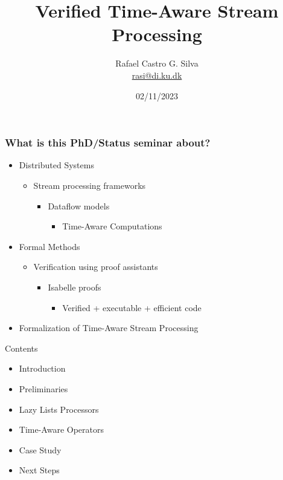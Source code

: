 \documentclass[aspectratio=169,10pt]{beamer}
\title[Verified Time-Aware Stream Processing]{Verified Time-Aware Stream Processing}
\author[Rafael Castro]{
  Rafael Castro G. Silva\\\medskip
  {\small \url{rasi@di.ku.dk}}}
\date{02/11/2023}
\institute[UCPH]{
  Department of Computer Science \\
  University of Copenhagen}
\begin{document}
\begin{frame}
  \titlepage

\end{frame}

\begin{frame}[fragile]
  \frametitle{What is this PhD/Status seminar about?}
  \begin{itemize}
          \pause
    \item Distributed Systems
          \begin{itemize}
            \item Stream processing frameworks
                  \begin{itemize}
                    \item Dataflow models
                          \begin{itemize}
                            \item Time-Aware Computations
                          \end{itemize}
                  \end{itemize}
          \end{itemize}
          \pause
    \item Formal Methods
          \begin{itemize}
            \item Verification using proof assistants
                  \begin{itemize}
                    \item Isabelle proofs
                          \begin{itemize}
                            \item Verified + executable + efficient code
                          \end{itemize}
                  \end{itemize}
          \end{itemize}
    \item Formalization of Time-Aware Stream Processing
  \end{itemize}
\end{frame}

\begin{frame}{Contents}
  \begin{itemize}
    \item Introduction
    \item Preliminaries
    \item Lazy Lists Processors
    \item Time-Aware Operators
    \item Case Study
    \item Next Steps
  \end{itemize}
\end{frame}
\end{document}
